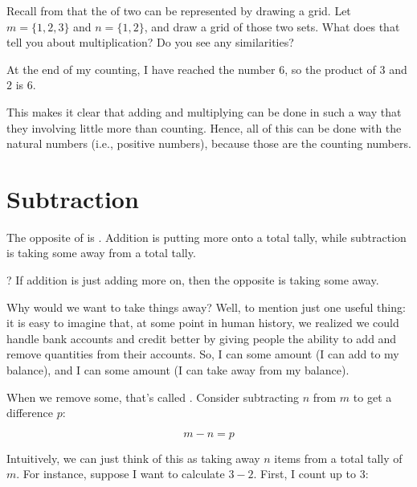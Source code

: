 \documentclass[../../../main.tex]{subfiles}
\begin{document}
\begin{ponder}
  Recall from  that the  of two  can be represented by drawing a grid. Let $m = \{ 1, 2, 3 \}$ and $n = \{ 1, 2 \}$, and draw a grid of those two sets. What does that tell you about multiplication? Do you see any similarities?
\end{ponder}

At the end of my counting, I have reached the number $6$, so the product of $3$ and $2$ is $6$.

This makes it clear that adding and multiplying can be done in such a way that they involving little more than counting. Hence, all of this can be done with the natural numbers (i.e., positive numbers), because those are the counting numbers.


\section{Subtraction}

\begin{aside}
  \begin{remark}
    The opposite of  is . Addition is putting more onto a total tally, while subtraction is taking some away from a total tally.
  \end{remark}
\end{aside}

? If addition is just adding more on, then the opposite is taking some away. 

Why would we want to take things away? Well, to mention just one useful thing: it is easy to imagine that, at some point in human history, we realized we could handle bank accounts and credit better by giving people the ability to add and remove quantities from their accounts. So, I can  some amount (I can add to my balance), and I can  some amount (I can take away from my balance).

When we remove some, that's called . Consider subtracting $n$ from $m$ to get a difference $p$:

\begin{equation*}
  m - n = p
\end{equation*}

Intuitively, we can just think of this as taking away $n$ items from a total tally of $m$. For instance, suppose I want to calculate $3 - 2$. First, I count up to 3:
\end{document}
